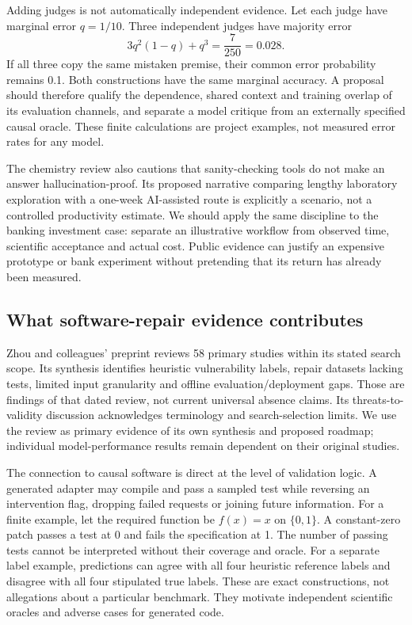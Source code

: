 Adding judges is not automatically independent evidence. Let each judge have marginal error $q=1/10$. Three independent judges have majority error
\[
 3q^2(1-q)+q^3=\frac{7}{250}=0.028.
\]
If all three copy the same mistaken premise, their common error probability remains 0.1. Both constructions have the same marginal accuracy. A proposal should therefore qualify the dependence, shared context and training overlap of its evaluation channels, and separate a model critique from an externally specified causal oracle. These finite calculations are project examples, not measured error rates for any model.~\citep{exec25_cow_reference}

The chemistry review also cautions that sanity-checking tools do not make an answer hallucination-proof. Its proposed narrative comparing lengthy laboratory exploration with a one-week AI-assisted route is explicitly a scenario, not a controlled productivity estimate. We should apply the same discipline to the banking investment case: separate an illustrative workflow from observed time, scientific acceptance and actual cost. Public evidence can justify an expensive prototype or bank experiment without pretending that its return has already been measured.~\citep{exec25_cow_chemistry,exec25_cow_reference}

\subsection{What software-repair evidence contributes}

Zhou and colleagues' preprint reviews 58 primary studies within its stated search scope. Its synthesis identifies heuristic vulnerability labels, repair datasets lacking tests, limited input granularity and offline evaluation/deployment gaps. Those are findings of that dated review, not current universal absence claims. Its threats-to-validity discussion acknowledges terminology and search-selection limits. We use the review as primary evidence of its own synthesis and proposed roadmap; individual model-performance results remain dependent on their original studies.~\citep{exec25_cow_vulnerability}

The connection to causal software is direct at the level of validation logic. A generated adapter may compile and pass a sampled test while reversing an intervention flag, dropping failed requests or joining future information. For a finite example, let the required function be $f(x)=x$ on $\{0,1\}$. A constant-zero patch passes a test at 0 and fails the specification at 1. The number of passing tests cannot be interpreted without their coverage and oracle. For a separate label example, predictions can agree with all four heuristic reference labels and disagree with all four stipulated true labels. These are exact constructions, not allegations about a particular benchmark. They motivate independent scientific oracles and adverse cases for generated code.~\citep{exec25_cow_reference}


